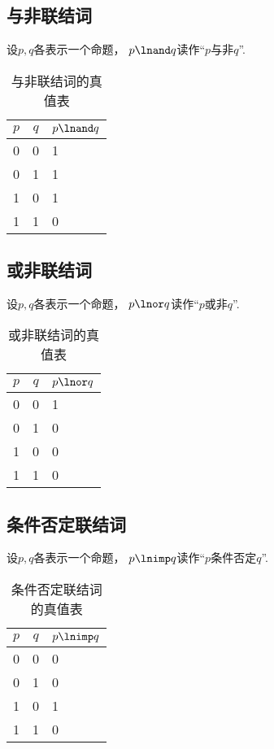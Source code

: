 \subsection{与非联结词}
设\(p,q\)各表示一个命题，
\(p \lnand q\)读作“\(p\)与非\(q\)”.

\begin{table}[ht]
	\centering
	\begin{tabular}{|*{2}{c|}p{2cm}|}
		\hline
		\(p\) & \(q\) & \(p \lnand q\) \\
		\hline
		0 & 0 & 1 \\
		0 & 1 & 1 \\
		1 & 0 & 1 \\
		1 & 1 & 0 \\
		\hline
	\end{tabular}
	\caption{与非联结词的真值表}
\end{table}

\subsection{或非联结词}
设\(p,q\)各表示一个命题，
\(p \lnor q\)读作“\(p\)或非\(q\)”.

\begin{table}[ht]
	\centering
	\begin{tabular}{|*{2}{c|}p{2cm}|}
		\hline
		\(p\) & \(q\) & \(p \lnor q\) \\
		\hline
		0 & 0 & 1 \\
		0 & 1 & 0 \\
		1 & 0 & 0 \\
		1 & 1 & 0 \\
		\hline
	\end{tabular}
	\caption{或非联结词的真值表}
\end{table}

\subsection{条件否定联结词}
设\(p,q\)各表示一个命题，
\(p \lnimp q\)读作“\(p\)条件否定\(q\)”.

\begin{table}[ht]
	\centering
	\begin{tabular}{|*{2}{c|}p{2cm}|}
		\hline
		\(p\) & \(q\) & \(p \lnimp q\) \\
		\hline
		0 & 0 & 0 \\
		0 & 1 & 0 \\
		1 & 0 & 1 \\
		1 & 1 & 0 \\
		\hline
	\end{tabular}
	\caption{条件否定联结词的真值表}
\end{table}

